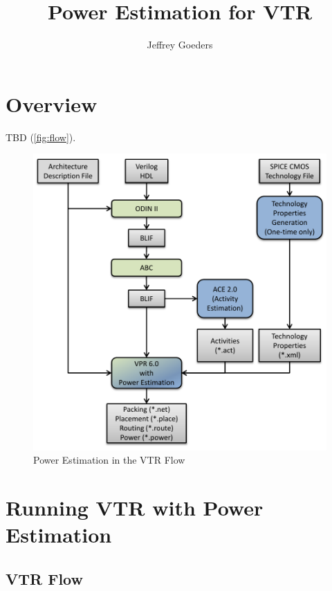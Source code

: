 \documentclass[letterpaper,twoside,10pt]{article}
\begin{document}
\renewcommand*{\chapterautorefname}{Chapter}
\renewcommand*{\sectionautorefname}{Section}
\renewcommand*{\subsectionautorefname}{Section}
\renewcommand*{\subsubsectionautorefname}{Section}

\title{Power Estimation for VTR}
\author{Jeffrey Goeders}
\maketitle

\setcounter{tocdepth}{2}
\tableofcontents %


\newpage
\section{Overview}
	TBD (\autoref{fig:flow}).
\begin{figure}[ht]
	\centering
	\includegraphics[scale=0.8]{images/flow.pdf}
	\caption{Power Estimation in the VTR Flow}
	\label{fig:flow}
\end{figure}


\newpage
\section{Running VTR with Power Estimation}
\subsection{VTR Flow}
\end{document}
